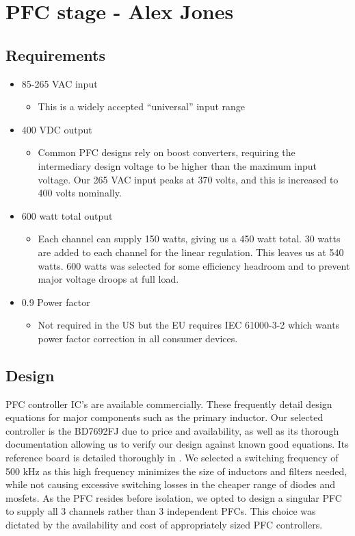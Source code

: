 \documentclass[12pt]{article}
\begin{document}
\section{PFC stage  - Alex Jones}
\subsection{Requirements}
\begin{itemize}
\item 85-265 VAC input \begin{itemize}
    \item This is a widely accepted “universal” input range
\end{itemize}
\item 400 VDC output \begin{itemize}
    \item Common PFC designs rely on boost converters, requiring the intermediary design voltage to be higher than the maximum input voltage. Our 265 VAC input peaks at 370 volts, and this is increased to 400 volts nominally.
\end{itemize}
\item 600 watt total output \begin{itemize}
    \item Each channel can supply 150 watts, giving us a 450 watt total. 30 watts are added to each channel for the linear regulation. This leaves us at 540 watts. 600 watts was selected for some efficiency headroom and to prevent major voltage droops at full load.
\end{itemize}
\item 0.9 Power factor \begin{itemize}
    \item Not required in the US but the EU requires IEC 61000-3-2\cite{4} which wants power factor correction in all consumer devices. 
\end{itemize}
\end{itemize}


\subsection{Design}
PFC controller IC’s are available commercially. These frequently detail design equations for major components such as the primary inductor. Our selected controller is the BD7692FJ due to price and availability, as well as its thorough documentation allowing us to verify our design against known good equations. Its reference board is detailed thoroughly in \cite{1}. We selected a switching frequency of 500 kHz as this high frequency minimizes the size of inductors and filters needed, while not causing excessive switching losses in the cheaper range of diodes and mosfets. As the PFC resides before isolation, we opted to design a singular PFC to supply all 3 channels rather than 3 independent PFCs. This choice was dictated by the availability and cost of appropriately sized PFC controllers. \\
\end{document}
